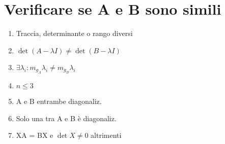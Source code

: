 \section{Verificare se A e B sono simili}
\begin{enumerate}[noitemsep]
	\item Traccia, determinante o rango diversi \Frowny{}
	\item $\det(A-\lambda I) \ne \det(B-\lambda I)$ \Frowny{}
	\item $\exists \lambda_i: m_{g_A} \lambda_i \ne m_{g_B} \lambda_i$ \Frowny{}
	\item $n \le 3$ \Smiley{}
	\item A e B entrambe diagonaliz. \Smiley{}
	\item Solo una tra A e B è diagonaliz. \Frowny{}
	\item XA = BX e $\det X \ne 0$ \Smiley{} altrimenti \Frowny
\end{enumerate}
